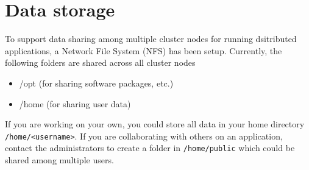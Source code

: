 \section{Data storage}

To support data sharing among multiple cluster nodes for running dsitributed applications, a Network File System (NFS) has been setup. Currently, the following folders are shared across all cluster nodes

\begin{itemize}
    \item /opt (for sharing software packages, etc.)
    \item /home (for sharing user data)
\end{itemize}

\noindent If you are working on your own, you could store all data in your home directory \lstinline{/home/<username>}. If you are collaborating with others on an application, contact the administrators to create a folder in \lstinline{/home/public} which could be shared among multiple users.